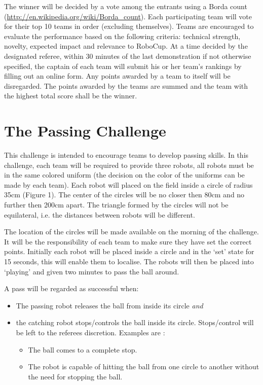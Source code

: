 \documentclass{article}
\begin{document}
The winner will be decided by a vote among the entrants using a Borda
count (\url{http://en.wikipedia.org/wiki/Borda_count}). Each participating 
team will vote for their top 10 teams in order (excluding themselves).
Teams are encouraged to evaluate the performance based on the
following criteria: technical strength, novelty, expected impact and
relevance to RoboCup. At a time decided by the designated referee,
within 30 minutes of the last demonstration if not otherwise
specified, the captain of each team will submit his or her team's rankings 
by filling out an online form.  Any points awarded by a team to itself will be 
disregarded. The points awarded by the teams are summed and the team with the 
highest total score shall be the winner.

\section{The Passing Challenge}
\label{sec:passing}
This challenge is intended to encourage teams to develop passing skills. In this challenge,
each team will be required to provide three robots, all robots must be in the same
colored uniform (the decision on the color of the uniforms can be made by each team).
Each robot will placed on the field inside a circle of radius 35cm (Figure 1). The center of the circles will be no closer
then 80cm and no further then 200cm apart. The triangle formed by the circles will not
be equilateral, i.e. the distances between robots will be different.

The location of the circles will be made available on the morning of the challenge.
It will be the responsibility of each team to make sure they have set the correct points.
Initially each robot will be placed inside a circle and in the `set' state for 15 seconds,
this will enable them to localise. The robots will then be placed into `playing' and given
two minutes to pass the ball around.

A pass will be regarded as successful when:
\begin{itemize}
\item The passing robot releases the ball from inside its circle \emph{and}
\item the catching robot stops/controls the ball inside its circle. Stops/control will be
left to the referees discretion. Examples are :
\begin{itemize}
\item The ball comes to a complete stop.
\item The robot is capable of hitting the ball from one circle to another without the need for stopping the ball.
\end{itemize}
\end{itemize}
\end{document}
